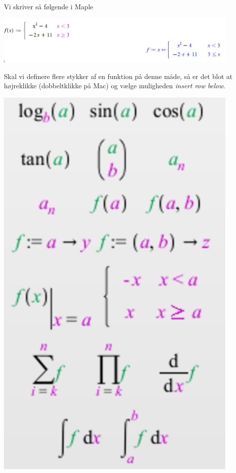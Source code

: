 \begin{exa}
	\begin{minipage}{0.69\textwidth}
		Vi skriver så følgende i Maple
		\begin{center}
			\includegraphics[width=0.9\textwidth]{Billeder/stykvisMaple}
		\end{center}
		Skal vi definere flere stykker af en funktion på denne måde, så er det blot at højreklikke (dobbeltklikke på Mac) og vælge muligheden \textit{insert row below}.
	\vspace{3cm}
	\end{minipage}
	\begin{minipage}{0.3\textwidth}
		\centering
		\includegraphics[width = 0.9\textwidth]{Billeder/palettestykvis}
	\end{minipage}

\end{exa}

